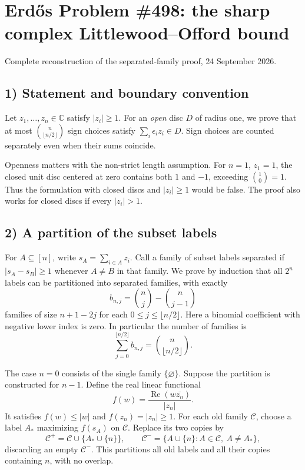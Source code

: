 \section{Erd\H{o}s Problem \#498: the sharp complex Littlewood--Offord bound}
\noindent Complete reconstruction of the separated-family proof, 24 September 2026.

\subsection*{1) Statement and boundary convention}
Let $z_1,\ldots,z_n\in\mathbb C$ satisfy $|z_i|\ge1$. For an \emph{open} disc $D$ of radius one, we prove that at most $\binom n{\lfloor n/2\rfloor}$ sign choices satisfy $\sum_i\epsilon_i z_i\in D$. Sign choices are counted separately even when their sums coincide.

Openness matters with the non-strict length assumption. For $n=1$, $z_1=1$, the closed unit disc centered at zero contains both $1$ and $-1$, exceeding $\binom10=1$. Thus the formulation with closed discs and $|z_i|\ge1$ would be false. The proof also works for closed discs if every $|z_i|>1$.

\subsection*{2) A partition of the subset labels}
For $A\subseteq[n]$, write $s_A=\sum_{i\in A}z_i$. Call a family of subset labels separated if $|s_A-s_B|\ge1$ whenever $A\ne B$ in that family. We prove by induction that all $2^n$ labels can be partitioned into separated families, with exactly
\[b_{n,j}=\binom nj-\binom n{j-1}
\]
families of size $n+1-2j$ for each $0\le j\le\lfloor n/2\rfloor$. Here a binomial coefficient with negative lower index is zero. In particular the number of families is
\[\sum_{j=0}^{\lfloor n/2\rfloor}b_{n,j}=\binom n{\lfloor n/2\rfloor}.\tag{1}\]

The case $n=0$ consists of the single family $\{\varnothing\}$. Suppose the partition is constructed for $n-1$. Define the real linear functional
\[f(w)=\frac{\operatorname{Re}(w\overline{z_n})}{|z_n|}.
\]
It satisfies $f(w)\le|w|$ and $f(z_n)=|z_n|\ge1$. For each old family $\mathcal C$, choose a label $A_*$ maximizing $f(s_A)$ on $\mathcal C$. Replace its two copies by
\[
\mathcal C^+=\mathcal C\cup\{A_*\cup\{n\}\},\qquad
\mathcal C^-=\{A\cup\{n\}:A\in\mathcal C,\ A\ne A_*\},
\tag{2}
\]
discarding an empty $\mathcal C^-$. This partitions all old labels and all their copies containing $n$, with no overlap.


